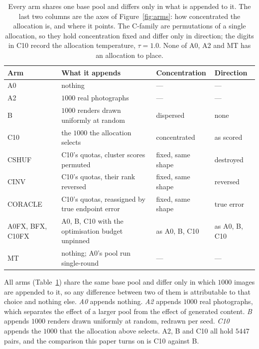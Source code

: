 \documentclass{article}
\newcommand{\atemp}{\tau}
\begin{document}
\begin{table}[t]
\caption{Every arm shares one base pool and differs only in what is appended to it. The last two columns are the axes of Figure~\ref{fig:arms}: how concentrated the allocation is, and where it points. The C-family are permutations of a single allocation, so they hold concentration fixed and differ only in direction; the digits in C10 record the allocation temperature,
$\atemp = 1.0$. None of A0, A2 and MT has an allocation to place.}
\label{tab:arms}
\begin{center}
\small
\setlength{\tabcolsep}{4pt}
\begin{tabular}{@{}llll@{}}
\toprule
Arm & What it appends & Concentration & Direction \\
\midrule
A0 & nothing & --- & --- \\
A2 & $1000$ real photographs & --- & --- \\
B & $1000$ renders drawn uniformly at random & dispersed & none \\
C10 & the $1000$ the allocation selects & concentrated & as scored \\
\midrule
CSHUF & C10's quotas, cluster scores permuted & fixed, same shape & destroyed \\
CINV & C10's quotas, their rank reversed & fixed, same shape & reversed \\
CORACLE & C10's quotas, reassigned by true endpoint error & fixed, same shape & true error \\
\midrule
A0FX, BFX, C10FX & A0, B, C10 with the optimisation budget unpinned & as A0, B, C10 & as A0, B, C10 \\
MT & nothing; A0's pool run single-round & --- & --- \\
\bottomrule
\end{tabular}
\end{center}
\end{table}

All arms (Table~\ref{tab:arms}) share the same base pool and differ
only in which $1000$ images are appended to it, so any difference between two of them is
attributable to that choice and nothing else. \textit{A0} appends
nothing. \textit{A2} appends $1000$ real photographs, which separates the effect of a larger pool
from the effect of generated content. \textit{B} appends $1000$ renders drawn uniformly at random,
redrawn per seed. \textit{C10} appends the $1000$ that the allocation above selects. A2, B and C10
all hold $5447$ pairs, and the comparison this paper turns on is C10 against B.
\end{document}
